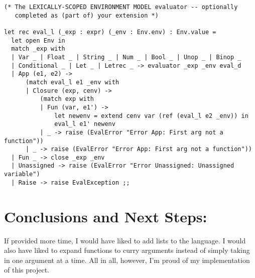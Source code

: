 \documentclass[12pt]{article}
\theoremstyle{definition}
\begin{document}
\begin{verbatim}
(* The LEXICALLY-SCOPED ENVIRONMENT MODEL evaluator -- optionally
   completed as (part of) your extension *)
   
let rec eval_l (_exp : expr) (_env : Env.env) : Env.value =
  let open Env in 
  match _exp with 
  | Var _ | Float _ | String _ | Num _ | Bool _ | Unop _ | Binop _ 
  | Conditional _ | Let _ | Letrec _ -> evaluator _exp _env eval_d
  | App (e1, e2) -> 
      (match eval_l e1 _env with 
      | Closure (exp, cenv) ->
          (match exp with 
          | Fun (var, e1') -> 
              let newenv = extend cenv var (ref (eval_l e2 _env)) in
              eval_l e1' newenv 
          | _ -> raise (EvalError "Error App: First arg not a function"))
      | _ -> raise (EvalError "Error App: First arg not a function"))
  | Fun _ -> close _exp _env
  | Unassigned -> raise (EvalError "Error Unassigned: Unassigned variable")
  | Raise -> raise EvalException ;;

\end{verbatim}

\section{Conclusions and Next Steps: }

If provided more time, I would have liked to add lists to the language. I would also have liked to expand functions to curry arguments instead of simply taking in one argument at a time. All in all, however, I'm proud of my implementation of this project.
\end{document}
